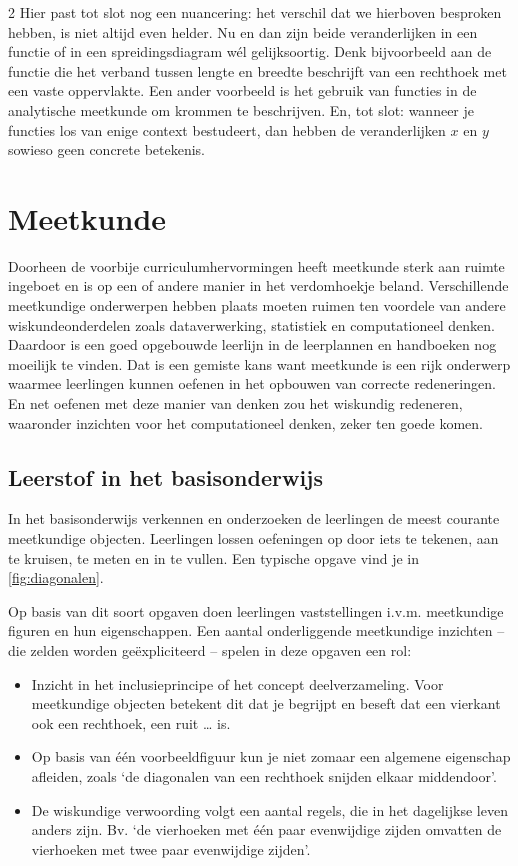 \begin{multicols}{2}
Hier past tot slot nog een nuancering: het verschil dat we hierboven besproken hebben, is niet altijd even helder.
Nu en dan zijn beide veranderlijken in een functie of in een spreidingsdiagram wél gelijksoortig.
Denk bijvoorbeeld aan de functie die het verband tussen lengte en breedte beschrijft van een rechthoek met een vaste oppervlakte.
Een ander voorbeeld is het gebruik van functies in de analytische meetkunde om krommen te beschrijven.
En, tot slot: wanneer je functies los van enige context bestudeert, dan hebben de veranderlijken \(x\) en \(y\) sowieso geen concrete betekenis.

\section{Meetkunde}\label{meetkunde}
Doorheen de voorbije curriculumhervormingen heeft meetkunde sterk aan ruimte ingeboet en is op een of andere manier in het verdomhoekje beland.
Verschillende meetkundige onderwerpen hebben plaats moeten ruimen ten voordele van andere wiskundeonderdelen zoals dataverwerking, statistiek en computationeel denken.
Daardoor is een goed opgebouwde leerlijn in de leerplannen en handboeken nog moeilijk te vinden.
Dat is een gemiste kans want meetkunde is een rijk onderwerp waarmee leerlingen kunnen oefenen in het opbouwen van correcte redeneringen.
En net oefenen met deze manier van denken zou het wiskundig redeneren, waaronder inzichten voor het computationeel denken, zeker ten goede komen.

\subsection{Leerstof in het basisonderwijs}
In het basisonderwijs verkennen en onderzoeken de leerlingen de meest courante meetkundige objecten.
Leerlingen lossen oefeningen op door iets te tekenen, aan te kruisen, te meten en in te vullen.
Een typische opgave vind je in \autoref{fig:diagonalen}.

Op basis van dit soort opgaven doen leerlingen vaststellingen i.v.m. meetkundige figuren en hun eigenschappen.
Een aantal onderliggende meetkundige inzichten -- die zelden worden geëxpliciteerd -- spelen in deze opgaven een rol:

\begin{itemize}
\item Inzicht in het inclusieprincipe of het concept deelverzameling.
Voor meetkundige objecten betekent dit dat je begrijpt en beseft dat een vierkant ook een rechthoek, een ruit \ldots{} is.
\item Op basis van één voorbeeldfiguur kun je niet zomaar een algemene eigenschap afleiden, zoals `de diagonalen van een rechthoek snijden elkaar middendoor'.
\item De wiskundige verwoording volgt een aantal regels, die in het dagelijkse leven anders zijn.
Bv. `de vierhoeken met één paar evenwijdige zijden omvatten de vierhoeken met twee paar evenwijdige zijden'.
\end{itemize}
\end{multicols}
